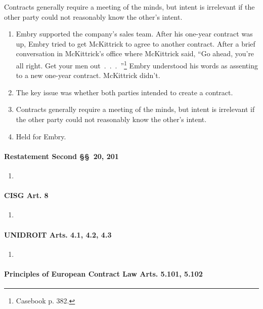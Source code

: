 Contracts generally require a meeting of the minds, but intent is irrelevant 
if the other party could not reasonably know the other's intent.

\begin{enumerate}
    \item Embry supported the company's sales team. After his one-year 
    contract was up, Embry tried to get McKittrick to agree to another 
    contract. After a brief conversation in McKittrick's office where 
    McKittrick said, ``Go ahead, you're all right. Get your men 
    out~.~.~.~''\footnote{Casebook p. 382.} Embry understood his words as 
    assenting to a new one-year contract. McKittrick didn't.
    \item The key issue was whether both parties intended to create a 
    contract.
    \item Contracts generally require a meeting of the minds, but intent is 
    irrelevant if the other party could not reasonably know the other's 
    intent.
    \item Held for Embry.
\end{enumerate}

\paragraph{Restatement Second \S\S\ 20, 201}

\begin{enumerate}
    \item %
\end{enumerate}

\paragraph{CISG Art. 8}

\begin{enumerate}
    \item %
\end{enumerate}

\paragraph{UNIDROIT Arts. 4.1, 4.2, 4.3}

\begin{enumerate}
    \item %
\end{enumerate}

\paragraph{Principles of European Contract Law Arts. 5.101, 5.102}


